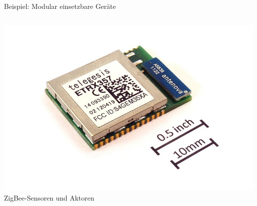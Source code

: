 {\begin{frame}{Beispiel: Modular einsetzbare Geräte}
\begin{columns}
        \includegraphics[width=.8\textwidth]{2-hardwaredesign/img/komponenten_geraete_zigbee} \\
        ZigBee-Sensoren und Aktoren
    \end{columns}
\end{frame}
}

